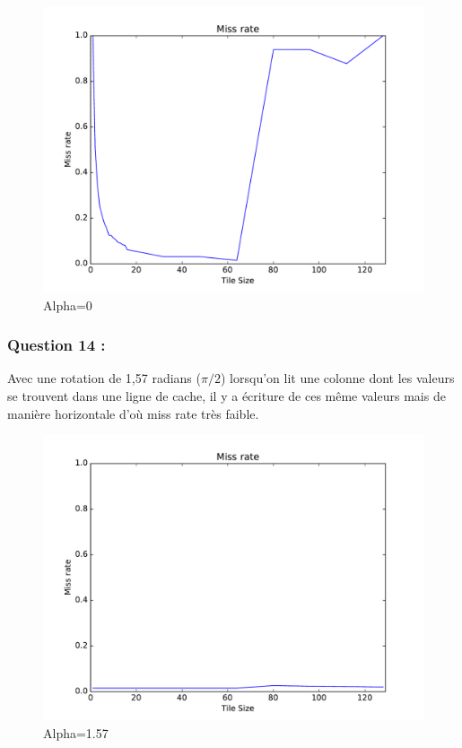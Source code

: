 \documentclass[11pt,a4paper]{article}
\begin{document}
	\begin{figure}[h]
		\centering
		\includegraphics[width=0.9\linewidth]{../res/expe_simple}
		\caption{Alpha=0}
	\end{figure}


	\newpage
	\subsubsection{Question 14 :}

	Avec une rotation de 1,57 radians ($ \pi/ 2 $) lorsqu'on lit une colonne
	dont les valeurs se trouvent dans une ligne de cache, il y a écriture de ces
	même valeurs mais de manière horizontale d'où miss rate très faible.
	\begin{figure}[h]
		\centering
		\includegraphics[width=0.9\linewidth]{../res/expe_simple1_57.pdf}
		\caption{Alpha=1.57}
	\end{figure}
\end{document}
